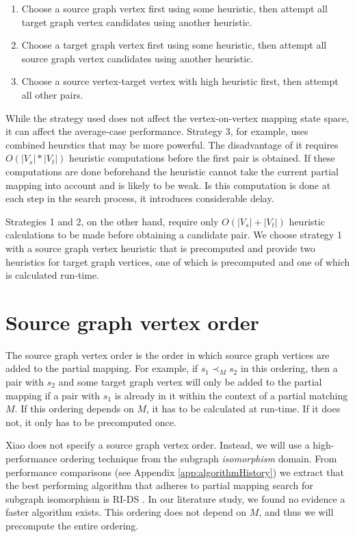 \begin{enumerate}
\item Choose a source graph vertex first using some heuristic, then attempt all target graph vertex candidates using another heuristic.
\item Choose a target graph vertex first using some heuristic, then attempt all source graph vertex candidates using another heuristic.
\item Choose a source vertex-target vertex with high heuristic first, then attempt all other pairs.
\end{enumerate}

While the strategy used does not affect the vertex-on-vertex mapping state space, it can affect the average-case performance. Strategy 3, for example, uses combined heurstics that may be more powerful. The disadvantage of it requires $O(|V_s|*|V_t|)$ heuristic computations before the first pair is obtained. If these computations are done beforehand the heuristic cannot take the current partial mapping into account and is likely to be weak. Is this computation is done at each step in the search process, it introduces considerable delay.

Strategies 1 and 2, on the other hand, require only $O(|V_s|+|V_t|)$ heuristic calculations to be made before obtaining a candidate pair. We choose strategy 1 with a source graph vertex heuristic that is precomputed and provide two heuristics for target graph vertices, one of which is precomputed and one of which is calculated run-time.

\section{Source graph vertex order}
\label{sec:sourceOrder}
The source graph vertex order is the order in which source graph vertices are added to the partial mapping. For example, if $s_1 \prec_M s_2$ in this ordering, then a pair with $s_2$ and some target graph vertex will only be added to the partial mapping if a pair with $s_1$ is already in it within the context of a partial matching $M$. If this ordering depends on $M$, it has to be calculated at run-time. If it does not, it only has to be precomputed once.

Xiao does not specify a source graph vertex order. Instead, we will use a high-performance ordering technique from the subgraph \textit{isomorphism} domain. From performance comparisons (see Appendix \ref{app:algorithmHistory}) we extract that the best performing algorithm that adheres to partial mapping search for subgraph isomorphism is RI-DS \cite{RIalgorithm}. In our literature study, we found no evidence a faster algorithm exists. This ordering does not depend on $M$, and thus we will precompute the entire ordering.

